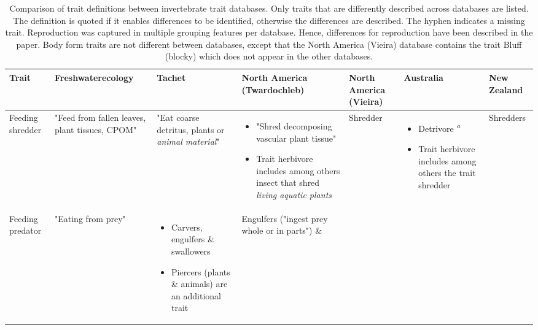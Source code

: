 \documentclass[../Draft_harmonization_paper.tex]{subfiles}
\begin{document}
\begin{landscape}
    \begin{longtable}{m{1.7cm}|m{3cm}|m{3cm}|m{3cm}|m{3cm}|m{3cm}|m{3cm}}
        \caption{Comparison of trait definitions between invertebrate trait databases. Only traits that are differently described across databases are listed. The definition is quoted if it enables differences to be identified, otherwise the differences are described. The hyphen indicates a missing trait. Reproduction was captured in multiple grouping features per database. Hence, differences for reproduction have been described in the paper. Body form traits are not different between databases, except that the North America (Vieira) database contains the trait Bluff (blocky) which does not appear in the other databases.}
        \label{stab:trait_definitions}
        \endfirsthead
        \toprule[.1em]
        Trait & Freshwaterecology & Tachet & \specialcell{North America \\ (Twardochleb)} & 
        North America (Vieira) & Australia & New Zealand \\
        \toprule[.1em]
        Feeding shredder & 
        "Feed from fallen leaves, plant tissues, CPOM" & 
        "Eat coarse detritus, plants or \textit{animal material}" & 
        \begin{itemize}
            \item "Shred decomposing vascular plant tissue"
            \item Trait herbivore includes among others insect that shred \textit{living aquatic plants} 
        \end{itemize} & 
        Shredder & 
        \begin{itemize}
            \item Detrivore \textsuperscript{\textit{a}}
            \item Trait herbivore includes among others the trait shredder
        \end{itemize} & 
        Shredders
        \\ 
        \midrule
        Feeding predator & 
        "Eating from prey" & 
        \begin{itemize}
            \item Carvers, engulfers \& swallowers
            \item Piercers (plants \& animals) are an additional trait
        \end{itemize} & %
        Engulfers ("ingest prey whole or in parts") \& 

\end{longtable}
\end{landscape}
\end{document}
